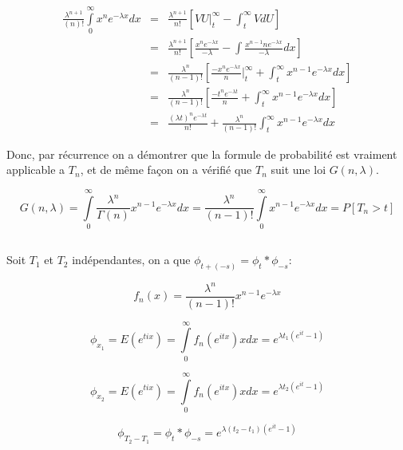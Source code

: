 \documentclass[a4paper]{article}
\begin{document}
\begin{eqnarray*}
\frac{\lambda^{n+1}}{(n)!}\int\limits_0^\infty x^{n}e^{-\lambda
  x}dx &=& \frac{\lambda^{n+1}}{n!}[VU|_t^\infty - \int_t^\infty VdU] \\
& =&\frac{\lambda^{n+1}}{n!}[\frac{x^n    e^{-\lambda     x}}{-\lambda}    -    \int
\frac{x^{n-1}n e^{-\lambda x}}{-\lambda}dx] \\
& =&  \frac{\lambda^{n}}{(n-1)!}[\frac{-x^n e^{-\lambda x}}{n}|_t^\infty +
\int_t^\infty{x^{n-1} e^{-\lambda x}}dx] \\
& =&  \frac{\lambda^{n}}{(n-1)!}[\frac{-t^n e^{-\lambda t}}{n} +
\int_t^\infty{x^{n-1} e^{-\lambda x}}dx] \\
& =& \frac{(\lambda t)^n e^{-\lambda t}}{n!} +
\frac{\lambda^{n}}{(n-1)!}\int_t^\infty{x^{n-1} e^{-\lambda x}}dx
\end{eqnarray*}

Donc, par récurrence  on a démontrer que la formule  de probabilité est vraiment
applicable a $T_n$, et de même façon on a vérifié que $T_n$ suit une loi $G(n,\lambda)$.

\begin{equation}
G(n,\lambda)= \int\limits_0^\infty \frac{\lambda^{n}}{\Gamma (n)}x^{n-1}e^{-\lambda x}dx=\frac{\lambda^{n}}{(n-1)!}\int\limits_0^\infty x^{n-1}e^{-\lambda x}dx=P[T_n > t]
\end{equation}


\subsection{}
Soit $T_1$ et $T_2$ indépendantes, on a que $\phi_{t+(-s)}=\phi_t*\phi_{-s}$:

\begin{equation}
f_n(x)=\frac{\lambda^{n}}{(n-1)!}x^{n-1}e^{-\lambda x}
\end{equation}

\begin{equation}
\phi_{x_1}=E(e^{tix})=\int\limits_0^\infty f_n(e^{itx})xdx=e^{\lambda t_1(e^{it}-1)}
\end{equation}

\begin{equation}
\phi_{x_2}=E(e^{tix})=\int\limits_0^\infty f_n(e^{itx})xdx=e^{\lambda t_2(e^{it}-1)}
\end{equation}

\begin{equation}
\phi_{T_2-T_1}=\phi_t*\phi_{-s}=e^{\lambda (t_2-t_1)(e^{it}-1)}
\end{equation}
\end{document}
